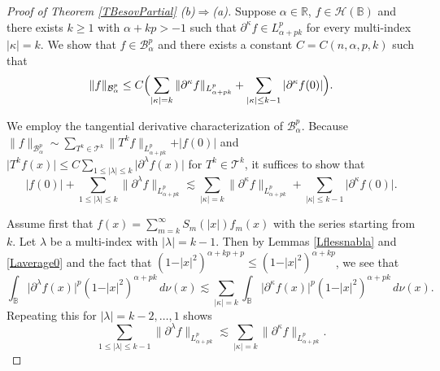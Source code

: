 \documentclass{amsart}
\theoremstyle{definition}
\theoremstyle{remark}
\begin{document}
\begin{proof}[Proof of Theorem \ref{TBesovPartial} (b)$\Rightarrow$(a)]
Suppose $\alpha\in\mathbb R$, $f\in\mathcal H(\mathbb B)$
and there exists $k\ge 1$ with $\alpha+kp>-1$ such that
$\partial^\kappa f\in L^p_{\alpha+pk}$ for every multi-index $\vert\kappa\vert=k$.
We show that $f\in\mathcal B^p_\alpha$ and there exists a constant
$C=C(n,\alpha,p,k)$ such that
\begin{equation*}
\|f\|_{\mathcal B^p_\alpha}
\le C
\Bigl(\sum_{\vert\kappa\vert=k} \|\partial^\kappa f\|_{L^p_{\alpha+pk}}
     +\sum_{\vert\kappa\vert\le k-1} \vert\partial^\kappa f(0)\vert\Bigr).
\end{equation*}

We employ the tangential derivative characterization of $\mathcal B^p_\alpha$.
Because $\|f\|_{\mathcal B^p_\alpha}
\sim\sum_{T^k\in\mathcal T^k}\|T^k f\|_{L^p_{\alpha+pk}}+\vert f(0)\vert$
and $\vert T^k f(x)\vert
\le C\sum_{1\le\vert\lambda\vert\le k}\vert\partial^\lambda f(x)\vert$
for $T^k\in\mathcal T^k$, it suffices to show that
\begin{equation}\label{partlambdaf}
\vert f(0)\vert
+\sum_{1\le\vert\lambda\vert\le k}\|\partial^\lambda f\|_{L^p_{\alpha+pk}}
\lesssim \sum_{\vert\kappa\vert=k} \|\partial^\kappa f\|_{L^p_{\alpha+pk}}
     +\sum_{\vert\kappa\vert\le k-1} \vert\partial^\kappa f(0)\vert.
\end{equation}

Assume first that
$f(x)=\sum_{m=k}^\infty S_m(\vert x\vert)f_m(x)$ with the series starting from $k$.
Let $\lambda$ be a multi-index with $\vert\lambda\vert=k-1$.
Then by Lemmas \ref{Lflessnabla} and \ref{Laverage0} and the fact that
$(1-\vert x\vert^2)^{\alpha+kp+p}\le (1-\vert x\vert^2)^{\alpha+kp}$,
we see that
\begin{equation*}
\int_{\mathbb B} \vert \partial^\lambda f(x)\vert^p(1-\vert x\vert^2)^{\alpha+pk}\, d\nu(x)
\lesssim\sum_{\vert\kappa\vert=k}
\int_{\mathbb B} \vert \partial^\kappa f(x)\vert^p(1-\vert x\vert^2)^{\alpha+pk}\, d\nu(x).
\end{equation*}
Repeating this for $\vert\lambda\vert=k-2,\dots,1$ shows
\begin{equation}\label{FirstEst}
\sum_{1\le\vert\lambda\vert\le k-1}\|\partial^\lambda f\|_{L^p_{\alpha+pk}}
\lesssim
\sum_{\vert\kappa\vert=k}\|\partial^\kappa f\|_{L^p_{\alpha+pk}}.
\end{equation}


\end{proof}
\end{document}
